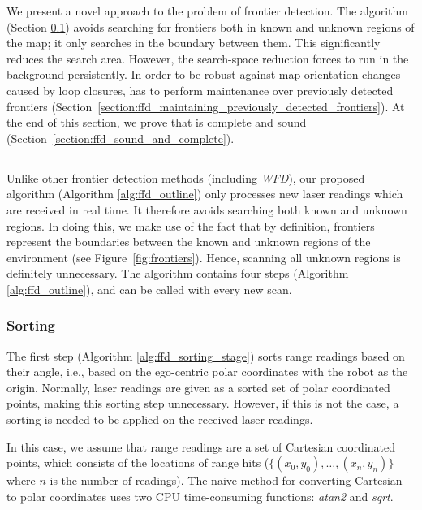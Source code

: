We present a novel approach to the problem of frontier
detection. The \FFD algorithm (Section \ref{section:ffd}) avoids searching
for frontiers both in known and unknown regions of the map; it only searches
in the boundary between them. This significantly reduces the search area.
However, the search-space reduction forces \FFD to run in the background
persistently. In order to be robust against map orientation changes caused by
loop closures, \FFD has to perform maintenance over previously detected
frontiers (Section~\ref{section:ffd_maintaining_previously_detected_frontiers}). At the end of
this section, we prove that \FFD is complete and sound (Section~\ref{section:ffd_sound_and_complete}).

\subsection{\FFD}
\label{section:ffd}
Unlike other frontier detection methods (including \emph{WFD}), our proposed
algorithm (Algorithm \ref{alg:ffd_outline}) only processes new laser
readings which are received in real time. It therefore avoids searching both
known and unknown regions. In doing this, we make use of the fact that by
definition, frontiers represent the boundaries between the known and unknown
regions of the environment (see Figure~\ref{fig:frontiers}). Hence, scanning all
unknown regions is definitely unnecessary. The \FFD
algorithm contains four steps (Algorithm \ref{alg:ffd_outline}), and
can be called with every new scan.




  \subsubsection{Sorting} 
	The first step (Algorithm \ref{alg:ffd_sorting_stage}) sorts range readings
	based on their angle, i.e., based on the ego-centric polar coordinates with the robot as the origin.
	Normally, laser readings are given as a sorted set of polar coordinated points, making this
        sorting step unnecessary. However, if this is not the
	case, a sorting is needed to be applied on the received laser readings.
	
	In this case, we assume that range readings are a set of Cartesian coordinated
	points, which consists of the locations of range hits ($ \big\{
	(x_0, y_0), \ldots, (x_n, y_n) \big\}$ where $n$ is the number of readings).
	The naive method for converting Cartesian to polar coordinates
	uses two CPU time-consuming functions: \emph{atan2} and \emph{sqrt}.

